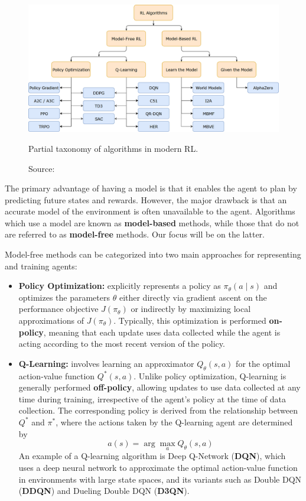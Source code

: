 \begin{figure}[h]
    \centering
    \includegraphics[width=.8\textwidth]{figures/ch3/4.rlalg.png}
    \caption{Partial taxonomy of algorithms in modern RL.}
    \vspace{-10px}
    \caption*{\scriptsize{Source: \cite{openaiPartKinds}}}
    \label{fig:mdp}
\end{figure}

The primary advantage of having a model is that it enables the agent
to plan by predicting future states and rewards.
However, the major drawback is that an accurate model of the environment
is often unavailable to the agent.
Algorithms which use a model are known as \textbf{model-based} methods,
while those that do not are referred to as \textbf{model-free} methods.
Our focus will be on the latter.

Model-free methods can be categorized into two main approaches
for representing and training agents:
\begin{itemize}
    \item \textbf{Policy Optimization:} explicitly represents a policy
    as \( \pi_{\theta}(a \mid s) \) and optimizes the parameters \( \theta \)
    either directly via gradient ascent on the performance objective
    \( J(\pi_{\theta}) \) or indirectly by maximizing local approximations
    of \( J(\pi_{\theta}) \).
    Typically, this optimization is performed \textbf{on-policy},
    meaning that each update uses data collected while the agent is acting
    according to the most recent version of the policy.

    \item \textbf{Q-Learning:} involves learning an approximator
    \( Q_{\theta}(s,a) \) for the optimal action-value function \( Q^*(s,a) \).
    Unlike policy optimization, Q-learning is generally performed \textbf{off-policy},
    allowing updates to use data collected at any time during training,
    irrespective of the agent's policy at the time of data collection.
    The corresponding policy is derived from the relationship between
    \( Q^* \) and \( \pi^* \), where the actions taken by the Q-learning
    agent are determined by
    \begin{equation}
    a(s) = \arg \max_a Q_{\theta}(s,a)
    \end{equation}
    An example of a Q-learning algorithm is Deep Q-Network (\textbf{DQN}),
    which uses a deep neural network to approximate the optimal action-value
    function in environments with large state spaces,
    and its variants such as Double DQN (\textbf{DDQN}) and
    Dueling Double DQN (\textbf{D3QN}).

\end{itemize}

